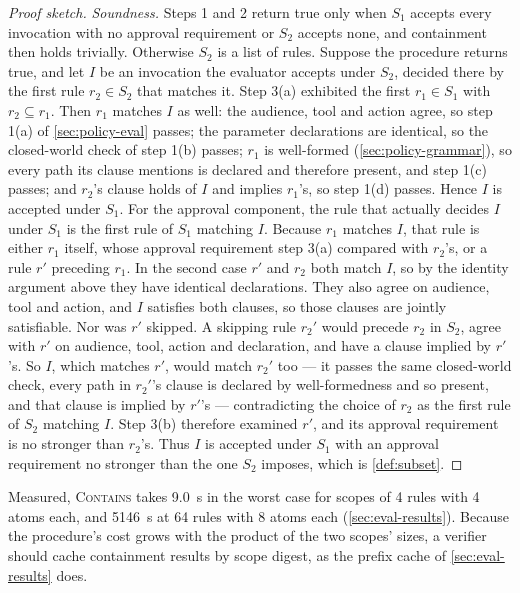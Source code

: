 \documentclass[11pt,a4paper]{article}
\begin{document}
\begin{proof}[Proof sketch]
\emph{Soundness.} Steps 1 and 2 return true only when $S_1$ accepts
every invocation with no approval requirement or $S_2$ accepts none, and
containment then holds trivially. Otherwise $S_2$ is a list of rules.
Suppose the procedure returns true, and let $I$ be an
invocation the evaluator accepts under $S_2$, decided there by the first
rule $r_2 \in S_2$ that matches it. Step 3(a) exhibited the first
$r_1 \in S_1$ with $r_2 \subseteq r_1$. Then $r_1$ matches $I$ as well:
the audience, tool and action agree, so step 1(a) of
\cref{sec:policy-eval} passes; the parameter
declarations are identical, so the closed-world check of step 1(b)
passes; $r_1$ is well-formed (\cref{sec:policy-grammar}), so every path
its clause mentions is declared and therefore present, and step 1(c)
passes; and $r_2$'s clause holds of $I$ and
implies $r_1$'s, so step 1(d) passes. Hence $I$ is accepted under $S_1$.
For the approval component, the rule that actually decides $I$ under
$S_1$ is the first rule of $S_1$ matching $I$. Because $r_1$ matches
$I$, that rule is either $r_1$ itself, whose approval requirement step
3(a) compared with $r_2$'s, or a rule $r'$ preceding $r_1$. In the
second case $r'$ and $r_2$ both match $I$, so by the identity argument
above they have identical declarations. They also agree on audience,
tool and action, and $I$ satisfies both clauses, so those clauses are
jointly satisfiable. Nor was $r'$ skipped. A skipping rule $r_2'$ would
precede $r_2$ in $S_2$, agree with $r'$ on audience, tool, action and
declaration, and have a clause implied by $r'$'s. So $I$, which matches
$r'$, would match $r_2'$ too --- it passes the same closed-world check,
every path in $r_2'$'s clause is declared by well-formedness and so
present, and that clause is implied by $r'$'s --- contradicting the choice of $r_2$ as the
first rule of $S_2$ matching $I$. Step 3(b) therefore examined
$r'$, and its approval requirement is no stronger than $r_2$'s. Thus $I$ is
accepted under $S_1$ with an approval requirement no stronger than the
one $S_2$ imposes, which is \cref{def:subset}.
\end{proof}

Measured, \textsc{Contains} takes 9.0~\textmu{}s in the worst case for
scopes of 4 rules with 4 atoms each, and 5146~\textmu{}s at 64 rules
with 8 atoms each (\cref{sec:eval-results}). Because the procedure's
cost grows with the product of the two scopes' sizes, a verifier should
cache containment results by scope digest, as the prefix cache of
\cref{sec:eval-results} does.
\end{document}

